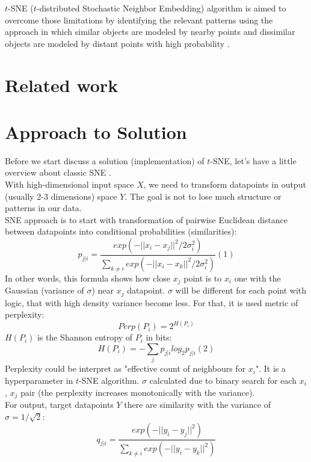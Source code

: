 $t$-SNE ($t$-distributed Stochastic Neighbor Embedding) algorithm is aimed to overcome those limitations by identifying the relevant patterns using the approach in which similar objects are modeled by nearby points and dissimilar objects are modeled by distant points with high probability \cite{tsnearticle}. 

\section{Related work}

\section{Approach to Solution}

Before we start discuss a solution (implementation) of $t$-SNE, let's have a little overview about classic SNE \cite{snearticle}.\\
With high-dimensional input space $X$, we need to transform datapoints in output (usually 2-3 dimensions) space $Y$. The goal is not to lose much structure or patterns in our data.\\
SNE approach is to start with transformation of pairwise Euclidean distance between datapoints into conditional probabilities (similarities):
$$ p_{j|i} = \frac{exp(-||x_i - x_j||^2 / 2 \sigma_i^2)}{\sum_{k \ne i}{exp(-||x_i - x_k||^2 / 2 \sigma_i^2)}} (1) $$
In other words, this formula shows how close $x_j$ point is to $x_i$ one with the Gaussian (variance of $\sigma$) near $x_j$ datapoint. $\sigma$ will be different for each point with logic, that with high density variance become less. For that, it is used metric of perplexity:
$$ Perp(P_i) = 2^{H(P_i)} $$
$H(P_i)$ is the Shannon entropy of $P_i$ in bits:
$$ H(P_i) = -\sum_j{}p_{j|i} log_2{p_{j|i}} (2) $$
Perplexity could be interpret as "effective count of neighbours for $x_i$". It is a hyperparameter in $t$-SNE algorithm. $\sigma$ calculated due to binary search for each $x_i$, $x_j$ pair (the perplexity increases monotonically with the variance).\\
For output, target datapoints $Y$ there are similarity with the variance of $\sigma = 1/\sqrt{2}$:
$$ q_{j|i} = \frac{exp(-||y_i - y_j||^2)}{\sum_{k \ne i}{exp(-||y_i - y_k||^2)}} $$

